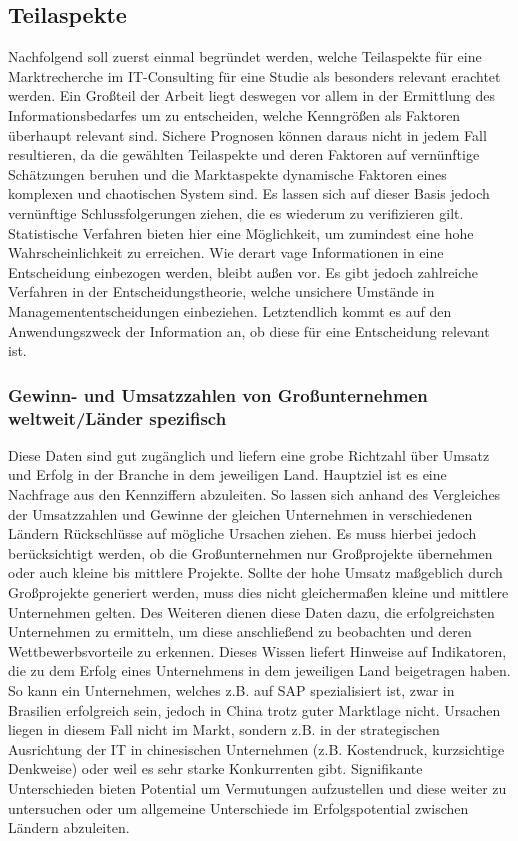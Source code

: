 \subsection{Teilaspekte}
Nachfolgend soll zuerst einmal begründet werden, welche Teilaspekte für eine Marktrecherche im IT-Consulting für eine Studie als besonders relevant erachtet werden.
Ein Großteil der Arbeit liegt deswegen vor allem in der Ermittlung des Informationsbedarfes um zu entscheiden, welche Kenngrößen als Faktoren überhaupt relevant sind.
Sichere Prognosen können daraus nicht in jedem Fall resultieren, da die gewählten Teilaspekte und deren Faktoren auf vernünftige Schätzungen beruhen und die Marktaspekte dynamische Faktoren eines komplexen und chaotischen System sind. Es lassen sich auf dieser Basis  jedoch vernünftige Schlussfolgerungen ziehen, die es wiederum zu verifizieren gilt. Statistische Verfahren bieten hier eine Möglichkeit, um zumindest eine hohe Wahrscheinlichkeit zu erreichen. 
Wie derart vage Informationen in eine Entscheidung einbezogen werden, bleibt außen vor. Es gibt jedoch zahlreiche Verfahren in der Entscheidungstheorie, welche unsichere Umstände in Managemententscheidungen einbeziehen. Letztendlich kommt es auf den Anwendungszweck der Information an, ob diese für eine Entscheidung relevant ist.
 
\subsubsection{Gewinn- und Umsatzzahlen von Großunternehmen weltweit/Länder spezifisch}
Diese Daten sind gut zugänglich und liefern eine grobe Richtzahl über Umsatz und Erfolg in der Branche in dem jeweiligen Land. Hauptziel ist es eine Nachfrage aus den Kennziffern abzuleiten. So lassen sich anhand des Vergleiches der Umsatzzahlen und Gewinne der gleichen Unternehmen in verschiedenen Ländern Rückschlüsse auf mögliche Ursachen ziehen.
 Es muss hierbei jedoch berücksichtigt werden, ob die Großunternehmen nur Großprojekte übernehmen oder auch kleine bis mittlere Projekte. Sollte der hohe Umsatz maßgeblich durch Großprojekte generiert werden, muss dies nicht gleichermaßen kleine und mittlere Unternehmen gelten.
Des Weiteren dienen diese Daten dazu, die erfolgreichsten Unternehmen zu ermitteln, um diese anschließend zu beobachten und deren Wettbewerbsvorteile zu erkennen. Dieses Wissen liefert Hinweise auf Indikatoren, die zu dem Erfolg eines Unternehmens in dem jeweiligen Land beigetragen haben.
 So kann ein Unternehmen, welches z.B. auf SAP spezialisiert ist, zwar in Brasilien erfolgreich sein, jedoch in China trotz guter Marktlage nicht. Ursachen liegen in diesem Fall nicht im Markt, sondern z.B. in der strategischen Ausrichtung der IT in chinesischen Unternehmen (z.B. Kostendruck, kurzsichtige Denkweise) oder weil es sehr starke Konkurrenten gibt.
Signifikante Unterschieden bieten Potential um Vermutungen aufzustellen und diese weiter zu untersuchen oder um allgemeine Unterschiede im Erfolgspotential zwischen Ländern abzuleiten. 

